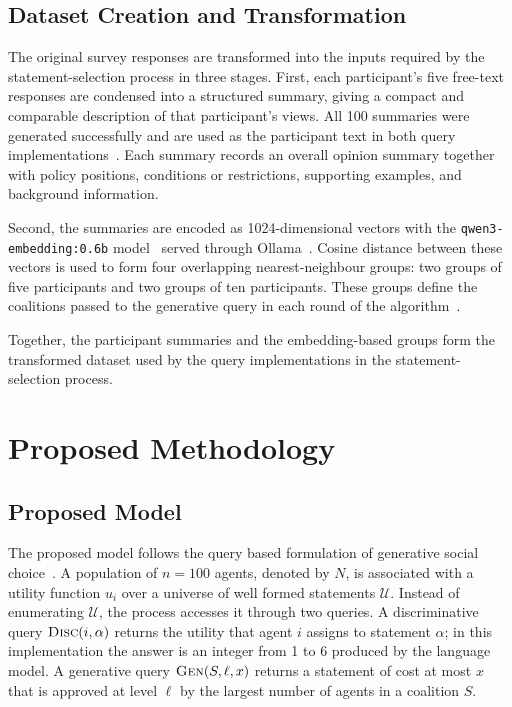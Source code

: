 \documentclass[letterpaper,11pt]{article}
\theoremstyle{plain}
\theoremstyle{definition}
\newcommand{\disquery}[2]{\textsc{Disc}(#1, #2)}
\newcommand{\genquery}[2]{\textsc{Gen}(#1, #2)}
\begin{document}
\subsection{Dataset Creation and Transformation}

The original survey responses are transformed into the inputs required by the statement-selection process in three stages. First, each participant's five free-text responses are condensed into a structured summary, giving a compact and comparable description of that participant's views. All 100 summaries were generated successfully and are used as the participant text in both query implementations~\citep{fish2026gsc,boehmer2025nextgen}. Each summary records an overall opinion summary together with policy positions, conditions or restrictions, supporting examples, and background information.

Second, the summaries are encoded as 1024-dimensional vectors with the \texttt{qwen3-embedding:0.6b} model~\citep{yang2025qwen3} served through Ollama~\citep{ollama2026}. Cosine distance between these vectors is used to form four overlapping nearest-neighbour groups: two groups of five participants and two groups of ten participants. These groups define the coalitions passed to the generative query in each round of the algorithm~\citep{boehmer2025nextgen}.

Together, the participant summaries and the embedding-based groups form the transformed dataset used by the query implementations in the statement-selection process.

\section{Proposed Methodology}

\subsection{Proposed Model}

The proposed model follows the query based formulation of generative social choice~\citep{fish2026gsc}. A population of $n=100$ agents, denoted by $N$, is associated with a utility function $u_i$ over a universe of well formed statements $\mathcal{U}$. Instead of enumerating $\mathcal{U}$, the process accesses it through two queries. A discriminative query $\disquery{i}{\alpha}$ returns the utility that agent $i$ assigns to statement $\alpha$; in this implementation the answer is an integer from 1 to 6 produced by the language model. A generative query $\genquery{S}{\ell,x}$ returns a statement of cost at most $x$ that is approved at level $\ell$ by the largest number of agents in a coalition $S$.
\end{document}
